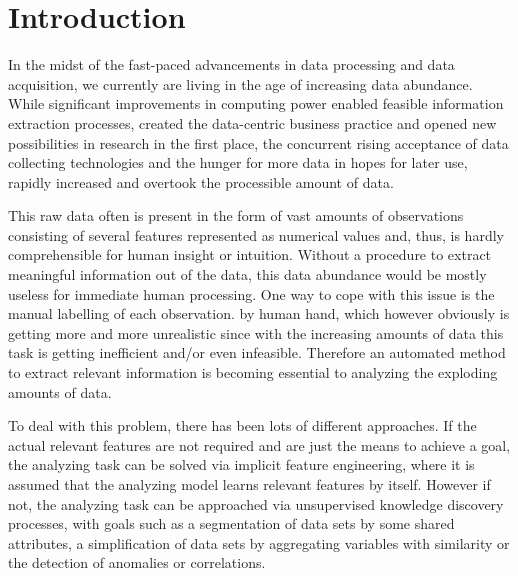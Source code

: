 \chapter{Introduction}\label{ch:intro}

In the midst of the fast-paced advancements in data processing and data acquisition, we currently are living in the age of increasing data abundance. While significant improvements in computing power enabled feasible information extraction processes, created the data-centric business practice and opened new possibilities in research in the first place, the concurrent rising acceptance of data collecting technologies and the hunger for more data in hopes for later use, rapidly increased and overtook the processible amount of data. 

This raw data often is present in the form of vast amounts of observations consisting of several features represented as numerical values and, thus, is hardly comprehensible for human insight or intuition. Without a 
procedure to extract meaningful information out of the data, this data abundance would be mostly useless for immediate human processing. One way to cope with this issue is the manual labelling of each observation. by human hand, which however obviously is getting more and more unrealistic since with the increasing amounts of data this task is getting inefficient and/or even infeasible. Therefore an automated method to extract relevant information is becoming essential to analyzing the exploding amounts of data. %

To deal with this problem, there has been lots of different approaches.
If the actual relevant features are not required and are just the means to achieve a goal, the analyzing task can be solved via implicit feature engineering, where it is assumed that the analyzing model learns relevant features by itself.
However if not, the analyzing task can be approached via unsupervised knowledge discovery processes, with goals such as a segmentation of data sets by some shared attributes, a simplification of data sets by aggregating variables with similarity or the detection of anomalies or correlations.


